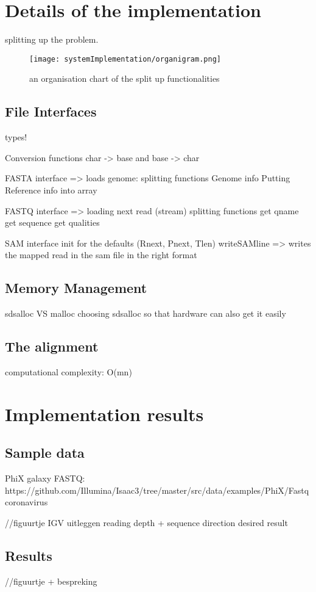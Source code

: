 \section{Details of the implementation}

splitting up the problem.

\begin{figure}[H]
	\centering
	\texttt{[image: systemImplementation/organigram.png]}
	\caption{an organisation chart of the split up functionalities}
	\label{fig:organigram}
\end{figure}

\subsection{File Interfaces}

types!

Conversion functions char -> base and base -> char

FASTA interface => loads genome:
splitting functions
Genome info
Putting Reference info into array

FASTQ interface => loading next read (stream)
splitting functions
get qname
get sequence
get qualities

SAM interface 
init for the defaults (Rnext, Pnext, Tlen)
writeSAMline => writes the mapped read in the sam file in the right format


\subsection{Memory Management}

sdsalloc VS malloc
choosing sdsalloc so that hardware can also get it easily

\subsection{The alignment}

computational complexity: O(mn)

\section{Implementation results}

\subsection{Sample data}

PhiX 
galaxy
FASTQ: https://github.com/Illumina/Isaac3/tree/master/src/data/examples/PhiX/Fastq
coronavirus

//figuurtje IGV
uitleggen reading depth + sequence direction
desired result

\subsection{Results}

//figuurtje + bespreking
